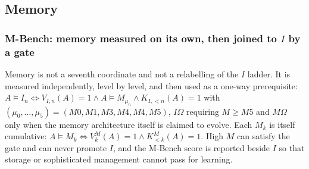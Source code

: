 \subsection{Memory}
\subsubsection{M-Bench: memory measured on its own, then joined to $I$ by a gate}\label{sec:mbench}

Memory is not a seventh coordinate and not a relabelling of the $I$ ladder. It is measured independently, level by level, and then used as a one-way prerequisite: $A \models I_n \iff V_{I,n}(A) = 1 \wedge A \models M_{\mu_n} \wedge K_{I,<n}(A) = 1$ with $(\mu_0,\ldots,\mu_5) = (M0, M1, M3, M4, M4, M5)$, $I\Omega$ requiring $M \ge M5$ and $M\Omega$ only when the memory architecture itself is claimed to evolve. Each $M_k$ is itself cumulative: $A \models M_k \iff V^{M}_k(A) = 1 \wedge K^{M}_{<k}(A) = 1$. High $M$ can satisfy the gate and can never promote $I$, and the M-Bench score is reported beside $I$ so that storage or sophisticated management cannot pass for learning.


